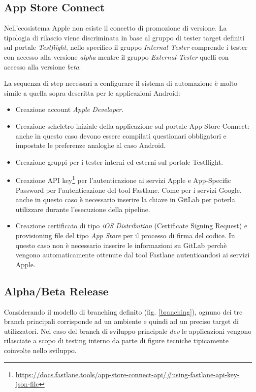 \subsection{App Store Connect}
Nell'ecosistema Apple non esiste il concetto di promozione di versione. La tipologia di rilascio viene discriminata in base al gruppo di tester target definiti sul portale \textit{Testflight}, nello specifico il gruppo \textit{Internal Tester} comprende i tester con accesso alla versione \textit{alpha} mentre il gruppo \textit{External Tester} quelli con accesso alla versione \textit{beta}. 

La sequenza di step necessari a configurare il sistema di automazione è molto simile a quella sopra descritta per le applicazioni Android:

\begin{itemize}
    \item Creazione account \textit{Apple Developer}.
    \item Creazione scheletro iniziale della applicazione sul portale App Store Connect: anche in questo caso devono essere compilati questionari obbligatori e impostate le preferenze analoghe al caso Android.
    \item Creazione gruppi per i tester interni ed esterni sul portale Testflight.
    \item Creazione API key\footnote{\href{https://docs.fastlane.tools/app-store-connect-api/\#using-fastlane-api-key-json-file}{https://docs.fastlane.tools/app-store-connect-api/\#using-fastlane-api-key-json-file}} per l'autenticazione ai servizi Apple e App-Specific Password per l'autenticazione del tool Fastlane. Come per i servizi Google, anche in questo caso è necessario inserire la chiave in GitLab per poterla utilizzare durante l'esecuzione della pipeline.
    \item Creazione certificato di tipo \textit{iOS Distribution} (Certificate Signing Request) e provisioning file del tipo \textit{App Store} per il processo di firma del codice. In questo caso non è necessario inserire le informazioni su GitLab perchè vengono automaticamente ottenute dal tool Fastlane autenticandosi ai servizi Apple.
\end{itemize}

\subsection{Alpha/Beta Release}
Considerando il modello di branching definito (fig. \ref{branching}), ognuno dei tre branch principali corrisponde ad un ambiente e quindi ad un preciso target di utilizzatori. Nel caso del branch di sviluppo principale \textit{dev} le applicazioni vengono rilasciate a scopo di testing interno da parte di figure tecniche tipicamente coinvolte nello sviluppo. 

